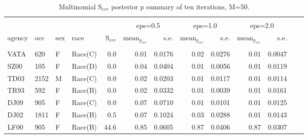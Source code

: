 \documentclass[10pt, letterpaper]{article}
\begin{document}
\begin{spacing}{1.0}
\begin{table}[h!]
    \centering
    \caption{Multinomial $\text{S}_{err}$ posterior p summary of ten iterations, M=50.}
    \label{table:mnerr-M50}
    \begin{tabular}{llllrrrrrrrrr}
        \hline\\[-10pt]
        & & & & & \multicolumn{2}{c}{eps=0.5} & \multicolumn{2}{c}{eps=1.0} & \multicolumn{2}{c}{eps=2.0} \\
        agency & occ & sex & race & $\text{S}_{err}$ & $\text{mean}_{p_{err}}$ & s.e. & $\text{mean}_{p_{err}}$ & s.e. & $\text{mean}_{p_{err}}$ & s.e. \\ 
        \hline\\[-6pt]
        VATA & 620 & F & Race(C) & 0.0 & 0.01 & 0.0176 & 0.02 & 0.0276 & 0.01 & 0.0047 \\ 
        SZ00 & 105 & F & Race(D) & 0.0 & 0.04 & 0.0404 & 0.01 & 0.0056 & 0.01 & 0.0119 \\ 
        TD03 & 2152 & M & Race(C) & 0.0 & 0.02 & 0.0203 & 0.01 & 0.0117 & 0.01 & 0.0114 \\ 
        TR93 & 592 & F & Race(B) & 0.0 & 0.02 & 0.0332 & 0.01 & 0.0039 & 0.01 & 0.0161 \\ 
        DJ09 & 905 & F & Race(C) & 0.0 & 0.07 & 0.0710 & 0.01 & 0.0101 & 0.01 & 0.0125 \\ 
        DJ02 & 1811 & F & Race(B) & 0.5 & 0.07 & 0.1024 & 0.03 & 0.0288 & 0.01 & 0.0143 \\ 
        LF00 & 905 & F & Race(B) & 44.6 & 0.85 & 0.0605 & 0.87 & 0.0406 & 0.87 & 0.0307 \\ 
        \hline
    \end{tabular}
\end{table}

\end{spacing}
  
\end{document}
